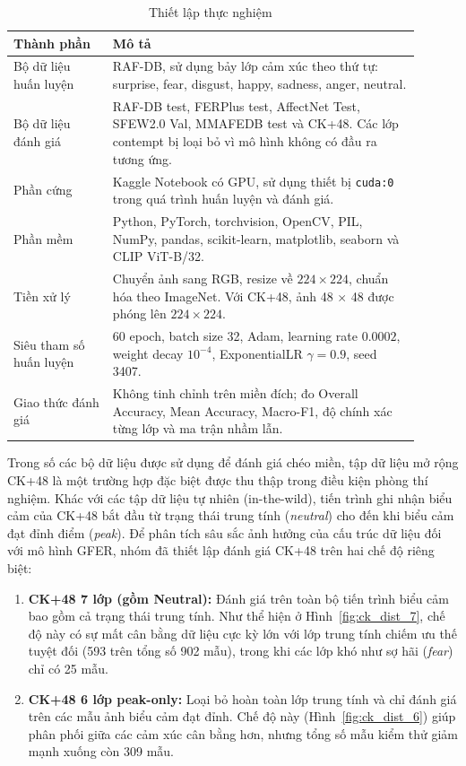 \begin{table}[htbp]
\centering
\caption{Thiết lập thực nghiệm}
\label{tab:demo_setup}
\begin{tabular}{p{0.22\linewidth}p{0.68\linewidth}}
\hline
\textbf{Thành phần} & \textbf{Mô tả} \\
\hline
Bộ dữ liệu huấn luyện & RAF-DB, sử dụng bảy lớp cảm xúc theo thứ tự: surprise, fear, disgust, happy, sadness, anger, neutral. \\
Bộ dữ liệu đánh giá & RAF-DB test, FERPlus test, AffectNet Test, SFEW2.0 Val, MMAFEDB test và CK+48. Các lớp contempt bị loại bỏ vì mô hình không có đầu ra tương ứng. \\
Phần cứng & Kaggle Notebook có GPU, sử dụng thiết bị \texttt{cuda:0} trong quá trình huấn luyện và đánh giá. \\
Phần mềm & Python, PyTorch, torchvision, OpenCV, PIL, NumPy, pandas, scikit-learn, matplotlib, seaborn và CLIP ViT-B/32. \\
Tiền xử lý & Chuyển ảnh sang RGB, resize về $224 \times 224$, chuẩn hóa theo ImageNet. Với CK+48, ảnh 48 $\times$ 48 được phóng lên $224 \times 224$. \\
Siêu tham số huấn luyện & 60 epoch, batch size 32, Adam, learning rate $0.0002$, weight decay $10^{-4}$, ExponentialLR $\gamma=0.9$, seed 3407. \\
Giao thức đánh giá & Không tinh chỉnh trên miền đích; đo Overall Accuracy, Mean Accuracy, Macro-F1, độ chính xác từng lớp và ma trận nhầm lẫn. \\
\hline
\end{tabular}
\end{table}

Trong số các bộ dữ liệu được sử dụng để đánh giá chéo miền, tập dữ liệu mở rộng CK+48 là một trường hợp đặc biệt được thu thập trong điều kiện phòng thí nghiệm. Khác với các tập dữ liệu tự nhiên (in-the-wild), tiến trình ghi nhận biểu cảm của CK+48 bắt đầu từ trạng thái trung tính (\textit{neutral}) cho đến khi biểu cảm đạt đỉnh điểm (\textit{peak}). Để phân tích sâu sắc ảnh hưởng của cấu trúc dữ liệu đối với mô hình GFER, nhóm đã thiết lập đánh giá CK+48 trên hai chế độ riêng biệt:
\begin{enumerate}
    \item \textbf{CK+48 7 lớp (gồm Neutral):} Đánh giá trên toàn bộ tiến trình biểu cảm bao gồm cả trạng thái trung tính. Như thể hiện ở Hình~\ref{fig:ck_dist_7}, chế độ này có sự mất cân bằng dữ liệu cực kỳ lớn với lớp trung tính chiếm ưu thế tuyệt đối (593 trên tổng số 902 mẫu), trong khi các lớp khó như sợ hãi (\textit{fear}) chỉ có 25 mẫu.
    \item \textbf{CK+48 6 lớp peak-only:} Loại bỏ hoàn toàn lớp trung tính và chỉ đánh giá trên các mẫu ảnh biểu cảm đạt đỉnh. Chế độ này (Hình~\ref{fig:ck_dist_6}) giúp phân phối giữa các cảm xúc cân bằng hơn, nhưng tổng số mẫu kiểm thử giảm mạnh xuống còn 309 mẫu.
\end{enumerate}

